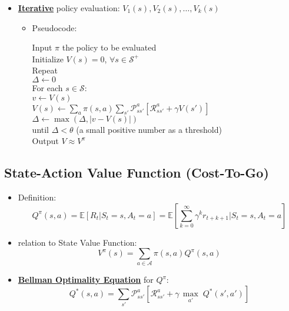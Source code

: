 \documentclass[twocolumn,landscape,10pt]{article}
\theoremstyle{definition}
\begin{document}
\begin{itemize}
    \item \textbf{\underline{Iterative}} policy evaluation:
        $V_1(s),V_2(s),\ldots,V_k(s)$
        \begin{itemize}
            \item Pseudocode: \label{code:1}
                
                Input $\pi$ the policy to be evaluated\\
                Initialize $V(s)=0$, $\forall s\in\mathcal{S}^+$\\
                Repeat\\
                \hspace*{2ex} $\Delta \leftarrow 0$\\
                \hspace*{2ex} For each $s\in\mathcal{S}$: \\
                \hspace*{2ex}\hspace*{2ex} $v\leftarrow V(s)$\\
                \hspace*{2ex}\hspace*{2ex} $V(s)\leftarrow
                \sum_a\pi(s,a)\sum_{s'}\mathcal{P}_{ss'}^a[\mathcal{R}_{ss'}^a+\gamma
                V(s')]$\\
                \hspace*{2ex}\hspace*{2ex} $\Delta\leftarrow
                \max{(\Delta,|v-V(s)|)}$\\
                until $\Delta<\theta$ (a small positive number as a threshold)\\
                Output $V\approx V^\pi$
        \end{itemize}
\end{itemize}

\subsection{State-Action Value Function (Cost-To-Go)}

\begin{itemize}
    \item Definition:
        \[
            Q^\pi(s,a)=\mathbb{E}[R_t|S_t=s,A_t=a]
            =\mathbb{E}\left[\sum_{k=0}^{\infty}\gamma^k r_{t+k+1}|S_t=s,A_t=a\right]
        \]
    \item relation to State Value Function:
        \[
            V^\pi(s)=\sum_{a\in\mathcal{A}}\pi(s,a)Q^\pi(s,a)
        \]
    \item \textbf{\underline{Bellman Optimality Equation}} for $Q^\pi$:
        \[
            Q^*(s,a)=\sum_{s'}\mathcal{P}_{ss'}^a\left[\mathcal{R}_{ss'}^a+\gamma\,
            \underset{a'}{\max}\;Q^*(s',a')\right]
        \]
\end{itemize}
\end{document}
